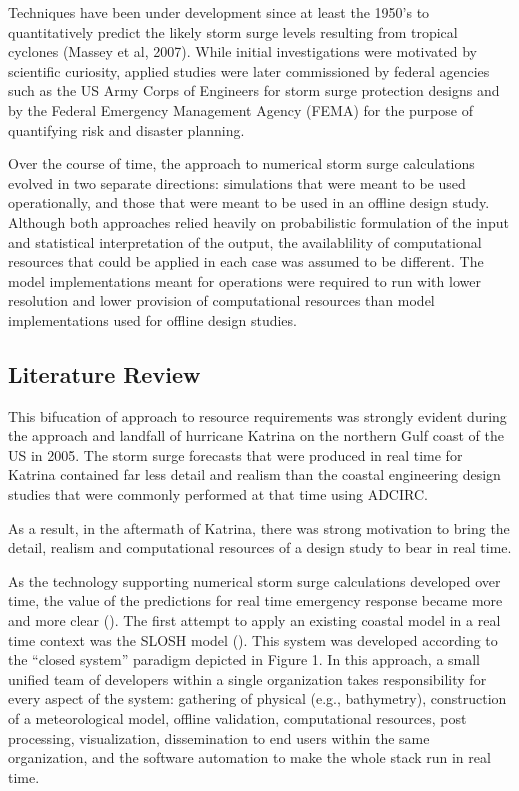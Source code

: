 \documentclass[12pt]{article}
\begin{document}
Techniques have been under development since at least the 1950’s to 
quantitatively predict the likely storm surge levels resulting from 
tropical cyclones (Massey et al, 2007). While initial investigations 
were motivated by scientific curiosity, applied studies were later 
commissioned by federal agencies such as the US Army Corps of 
Engineers for storm surge protection designs and by the Federal 
Emergency Management Agency (FEMA) for the purpose of quantifying 
risk and disaster planning. 

Over the course of time, the approach to numerical storm surge 
calculations evolved in two separate directions: simulations that 
were meant to be used operationally, and those that were meant to be 
used in an offline design study. Although both approaches relied 
heavily on probabilistic formulation of the input and statistical 
interpretation of the output, the availablility of computational 
resources that could be applied in each case was assumed to be 
different. The model implementations meant for operations were 
required to run with lower resolution and lower provision of 
computational resources than model implementations used for offline 
design studies. 

\subsection{Literature Review}

This bifucation of approach to resource requirements was strongly 
evident during the approach and landfall of hurricane Katrina on the 
northern Gulf coast of the US in 2005. The storm surge forecasts 
that were produced in real time for Katrina contained far less 
detail and realism than the coastal engineering design studies that 
were commonly performed at that time using ADCIRC. 

As a result, in the aftermath of Katrina, there was strong 
motivation to bring the detail, realism and computational resources 
of a design study to bear in real time.  

As the technology supporting numerical storm surge calculations 
developed over time, the value of the predictions for real time 
emergency response became more and more clear (\cite 
{JelesnianskiCP1992}). The first attempt to apply an existing 
coastal model in a real time context was the SLOSH model (\cite 
{JelesnianskiCP1992}). This system was developed according to the 
``closed system'' paradigm depicted in Figure 1. In this approach, a 
small unified team of developers within a single organization takes 
responsibility for every aspect of the system: gathering of physical 
(e.g., bathymetry), construction of a meteorological model, offline 
validation, computational resources, post processing, visualization, 
dissemination to end users within the same organization, and the 
software automation to make the whole stack run in real time. 
\end{document}
